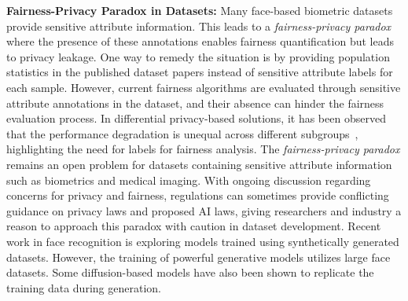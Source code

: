 \documentclass[journal]{IEEEtran}
\begin{document}
\noindent \textbf{Fairness-Privacy Paradox in Datasets:} Many face-based biometric datasets provide sensitive attribute information. This leads to a \textit{fairness-privacy paradox} where the presence of these annotations enables fairness quantification but leads to privacy leakage. One way to remedy the situation is by providing population statistics in the published dataset papers instead of sensitive attribute labels for each sample. However, current fairness algorithms are evaluated through sensitive attribute annotations in the dataset, and their absence can hinder the fairness evaluation process. In differential privacy-based solutions, it has been observed that the performance degradation is unequal across different subgroups~\cite{bagdasaryan2019differential}, highlighting the need for labels for fairness analysis. The \textit{fairness-privacy paradox} remains an open problem for datasets containing sensitive attribute information such as biometrics and medical imaging. With ongoing discussion regarding concerns for privacy and fairness, regulations can sometimes provide conflicting guidance on privacy laws and proposed AI laws, giving researchers and industry a reason to approach this paradox with caution in dataset development. Recent work in face recognition is exploring models trained using synthetically generated datasets\cite{qiu2021synface, melzi2023gandiffface, kim2023dcface}. However, the training of powerful generative models utilizes large face datasets. Some diffusion-based models have also been shown to replicate the training data during generation.


\end{document}
